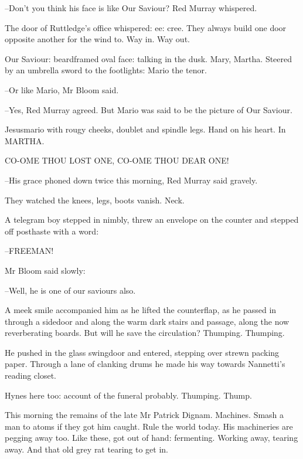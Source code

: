 --Don't you think his face is like Our Saviour? Red Murray whispered.

The door of Ruttledge's office whispered: ee: cree. They always build
one door opposite another for the wind to. Way in. Way out.

Our Saviour: beardframed oval face: talking in the dusk. Mary,
Martha. Steered by an umbrella sword to the footlights: Mario the tenor.

--Or like Mario, Mr Bloom said.

--Yes, Red Murray agreed. But Mario was said to be the picture of Our
Saviour.

Jesusmario with rougy cheeks, doublet and spindle legs. Hand on his
heart. In MARTHA.


    CO-OME THOU LOST ONE,
    CO-OME THOU DEAR ONE!



--His grace phoned down twice this morning, Red Murray said gravely.

They watched the knees, legs, boots vanish. Neck.

A telegram boy stepped in nimbly, threw an envelope on the counter
and stepped off posthaste with a word:

--FREEMAN!

Mr Bloom said slowly:

--Well, he is one of our saviours also.

A meek smile accompanied him as he lifted the counterflap, as he
passed in through a sidedoor and along the warm dark stairs and passage,
along the now reverberating boards. But will he save the circulation?
Thumping. Thumping.

He pushed in the glass swingdoor and entered, stepping over strewn
packing paper. Through a lane of clanking drums he made his way towards
Nannetti's reading closet.

Hynes here too: account of the funeral probably. Thumping. Thump.



This morning the remains of the late Mr Patrick Dignam. Machines.
Smash a man to atoms if they got him caught. Rule the world today. His
machineries are pegging away too. Like these, got out of hand: fermenting.
Working away, tearing away. And that old grey rat tearing to get in.



